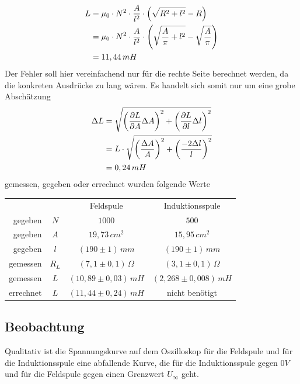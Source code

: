 \documentclass{article}
\begin{document}
\begin{align}
L &= \mu_0 \cdot N^2 \cdot \frac{A}{l^2} \cdot \left( \sqrt{R^2+l^2}-R \right)
\notag
\\
 &= \mu_0 \cdot N^2 \cdot \frac{A}{l^2} \cdot \left( \sqrt{\frac{A}{\pi}+l^2}-\sqrt{\frac{A}{\pi}} \right)
\notag
\\
&= 11,44 \, mH
\end{align}
Der Fehler soll hier vereinfachend nur für die rechte Seite berechnet werden, da die konkreten Ausdrücke zu lang wären. Es handelt sich somit nur um eine grobe Abschätzung 
\begin{align}
\Delta L &= \sqrt{
	\left(\frac{\partial L}{\partial A} \Delta A \right)^2 +
	\left(\frac{\partial L}{\partial l} \Delta l \right)^2 }
\notag
\\
&= L \cdot \sqrt{
	\left(\frac{\Delta A}{A} \right)^2 +
	\left(\frac{-2 \Delta l }{ l}  \right)^2 }
\notag
\\
&= 0,24 \, mH
\notag
\end{align}
gemessen, gegeben oder errechnet wurden folgende Werte

\begin{center}
\begin{tabular}{r c c c}
 & & Feldspule & Induktionsspule \\
gegeben & \(N\) & \(1000\) & \(500\) \\
gegeben & \(A\) & \(19,73\,cm^2\) & \(15,95\,cm^2\) \\
gegeben & \(l\) & \((190 \pm 1)\, mm\) & \((190 \pm 1)\, mm\) \\
gemessen & \(R_L\) & \((7,1 \pm 0,1)\, \Omega \) & \((3,1 \pm 0,1)\, \Omega \) \\
gemessen & \(L\) & \((10,89 \pm 0,03)\, mH \) & \((2,268 \pm 0,008)\, mH \) \\
errechnet & \(L\) & \((11,44 \pm 0,24)\, mH \) & nicht  benötigt \\

\end{tabular}
\end{center}

\subsection{Beobachtung}

Qualitativ ist die Spannungskurve auf dem Oszilloskop für die Feldspule und für die Induktionsspule eine abfallende Kurve, die für die Induktionsspule gegen \(0V\) und für die Feldspule gegen einen Grenzwert \( U_\infty \) geht. 
\end{document}
